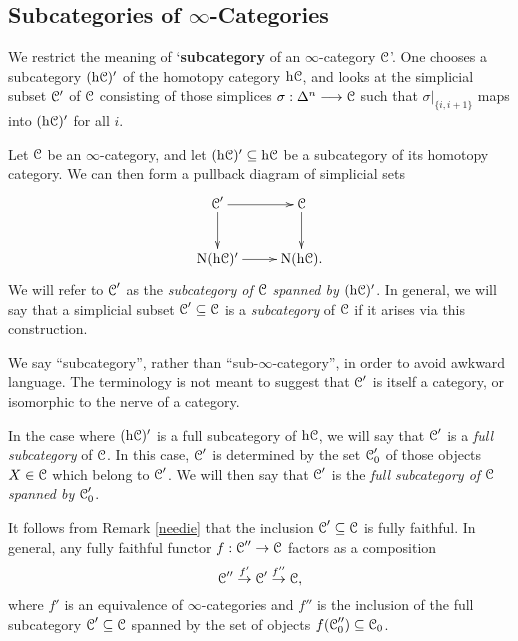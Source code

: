 \subsection{Subcategories of $\infty$-Categories}
\begin{1.2.11 Subcategories of inf-cats}
\begin{shaded}
We restrict the meaning of  `\textbf{subcategory} of an $\infty$-category $\mathcal{C}$'. One chooses a subcategory $(\rm{h} \it{\mathcal{C}})'$ of the homotopy category $\rm{h} \it{\mathcal{C}}$, and looks at the simplicial subset $\mathcal{C}'$ of $\mathcal{C}$ consisting of those simplices $\sigma:\Delta^n\longrightarrow\mathcal{C}$ such that $\sigma|_{\{i,i+1\}}$ maps into $(\rm{h} \it{\mathcal{C}})'$ for all $i$.
\end{shaded}
Let $\operatorname{\mathcal{C}}$ be an $\infty$-category, and let $(\rm{h} \it{\operatorname{\mathcal{C}}})' \subseteq \rm{h} \it{\operatorname{\mathcal{C}}}$ be a subcategory of its homotopy category. We can then form a pullback diagram of simplicial sets
$$ \xymatrix{ \calC' \ar[r] \ar[d] & \calC \ar[d] \\
\Nerve (\h{\calC})' \ar[r] & \Nerve (\h{ \calC}). }$$
We will refer to $\operatorname{\mathcal{C}}'$ as the {\it subcategory of $\operatorname{\mathcal{C}}$ spanned by $(\rm{h} \it{\operatorname{\mathcal{C}}})'$}. In general, we will say that a simplicial subset $\operatorname{\mathcal{C}}' \subseteq \operatorname{\mathcal{C}}$ is a {\it subcategory} of $\operatorname{\mathcal{C}}$ if it arises via this construction.

\begin{remark}
We say ``subcategory'', rather than ``sub-$\infty$-category'', in
order to avoid awkward language. The terminology is not meant to
suggest that $\operatorname{\mathcal{C}}'$ is itself a category, or isomorphic to the nerve
of a category.
\end{remark}

In the case where $(\rm{h} \it{\operatorname{\mathcal{C}}})'$ is a full subcategory of $\rm{h} \it{\operatorname{\mathcal{C}}}$, we will say that
$\operatorname{\mathcal{C}}'$ is a {\it full subcategory} of $\operatorname{\mathcal{C}}$. In this case, $\operatorname{\mathcal{C}}'$ is determined by the set
$\operatorname{\mathcal{C}}'_0$ of those objects $X \in \operatorname{\mathcal{C}}$ which belong to $\operatorname{\mathcal{C}}'$. We will then say that
$\operatorname{\mathcal{C}}'$ is the {\it full subcategory of $\operatorname{\mathcal{C}}$ spanned by $\operatorname{\mathcal{C}}'_0$}.

It follows from Remark \ref{needie} that
the inclusion $\operatorname{\mathcal{C}}' \subseteq \operatorname{\mathcal{C}}$ is fully faithful. In general, any fully faithful functor $f: \operatorname{\mathcal{C}}'' \rightarrow \operatorname{\mathcal{C}}$ factors as a composition
$$ \operatorname{\mathcal{C}}'' \stackrel{f'}{\rightarrow} \operatorname{\mathcal{C}}' \stackrel{f''}{\rightarrow} \operatorname{\mathcal{C}},$$
where $f'$ is an equivalence of $\infty$-categories and $f''$ is the inclusion of the full subcategory
$\operatorname{\mathcal{C}}' \subseteq \operatorname{\mathcal{C}}$ spanned by the set of objects $f( \operatorname{\mathcal{C}}''_0 ) \subseteq \operatorname{\mathcal{C}}_0$.
\end{1.2.11 Subcategories of inf-cats}

